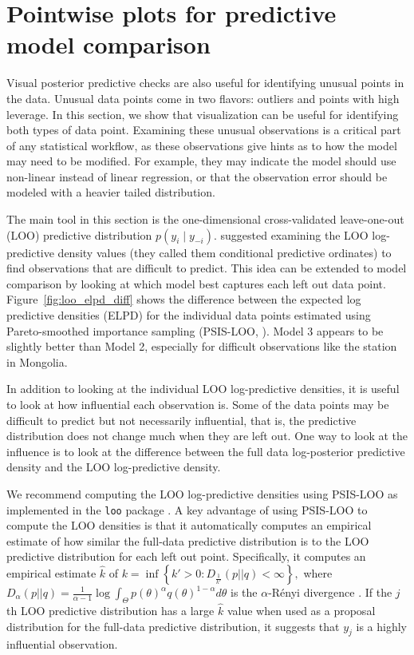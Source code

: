 \documentclass{statsoc}
\begin{document}
\section{Pointwise plots for predictive model comparison}
Visual posterior predictive checks are also useful for identifying unusual
points in the data. Unusual data points come in two flavors: outliers and points
with high leverage.  In this section, we show that visualization can be useful
for identifying both types of data point. Examining these unusual observations
is a critical part of any statistical workflow, as these observations give hints
as to how the model may need to be modified. For example, they may indicate the
model should use non-linear instead of linear regression, or that the
observation error should be modeled with a heavier tailed distribution.

The main tool in this section is the one-dimensional cross-validated
leave-one-out (LOO) predictive distribution $p(y_i \mid y_{-i})$.
\citet{GelfandDeyChang1992} suggested examining the LOO log-predictive density
values (they called them conditional predictive ordinates) to find observations
that are difficult to predict. This idea can be extended to model comparison by
looking at which model best captures each left out data point.
Figure~\ref{fig:loo_elpd_diff} shows the difference between the expected log
predictive densities (ELPD) for the individual data points estimated using
Pareto-smoothed importance sampling (PSIS-LOO, \citet{vehtari2016psis,
vehtari2017practical}). Model 3 appears to be slightly better than Model 2,
especially for difficult observations like the station in Mongolia.

In addition to looking at the individual LOO log-predictive densities, it is
useful to look at how influential each observation is. Some of the data points
may be difficult to predict but not necessarily influential, that is, the
predictive distribution does not change much when they are left out. 
One way to look at the influence is to look at the difference between the
full data log-posterior predictive density and the LOO log-predictive density.

We recommend computing the LOO log-predictive densities using PSIS-LOO as
implemented in the {\tt loo} package \citep{looRpackage}. A key advantage of
using PSIS-LOO to compute the LOO densities is that it automatically computes an
empirical estimate of how similar the full-data predictive distribution is to
the LOO predictive distribution for each left out point. Specifically, it
computes an empirical estimate $\hat{k}$ of
$k=\inf\left\{ k'>0 : D_{\frac{1}{k'}} \left(  p || q  \right)<\infty \right\},$
where
$D_{\alpha} \left(  p || q  \right) =
\frac{1}{\alpha-1} \log \int_{\Theta} p(\theta)^{\alpha} q(\theta)^{1-\alpha}  d \theta$
is the $\alpha$-R\'{e}nyi divergence \citep{yao2018yes}.
If the $j$th LOO predictive distribution has a large $\hat{k}$ value when used as
a proposal distribution for the full-data predictive distribution, it suggests
that $y_j$ is a highly influential observation.
\end{document}
